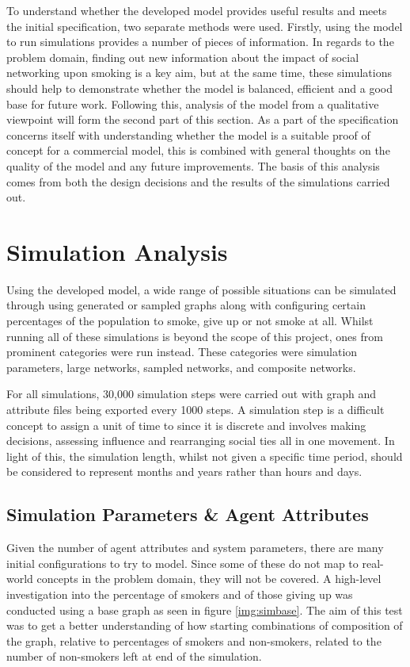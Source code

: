 \documentclass[]{report}
\begin{document}
To understand whether the developed model provides useful results and meets the initial specification, two separate methods were used. Firstly, using the model to run simulations provides a number of pieces of information. In regards to the problem domain, finding out new information about the impact of social networking upon smoking is a key aim, but at the same time, these simulations should help to demonstrate whether the model is balanced, efficient and a good base for future work. Following this, analysis of the model from a qualitative viewpoint will form the second part of this section. As a part of the specification concerns itself with understanding whether the model is a suitable proof of concept for a commercial model, this is combined with general thoughts on the quality of the model and any future improvements. The basis of this analysis comes from both the design decisions and the results of the simulations carried out.

\section{Simulation Analysis}
Using the developed model, a wide range of possible situations can be simulated through using generated or sampled graphs along with configuring certain percentages of the population to smoke, give up or not smoke at all. Whilst running all of these simulations is beyond the scope of this project, ones from prominent categories were run instead. These categories were simulation parameters, large networks, sampled networks, and composite networks.

For all simulations, 30,000 simulation steps were carried out with graph and attribute files being exported every 1000 steps. A simulation step is a difficult concept to assign a unit of time to since it is discrete and involves making decisions, assessing influence and rearranging social ties all in one movement. In light of this, the simulation length, whilst not given a specific time period, should be considered to represent months and years rather than hours and days.

\subsection{Simulation Parameters \& Agent Attributes}

Given the number of agent attributes and system parameters, there are many initial configurations to try to model. Since some of these do not map to real-world concepts in the problem domain, they will not be covered. A high-level investigation into the percentage of smokers and of those giving up was conducted using a base graph as seen in figure \ref{img:simbase}. The aim of this test was to get a better understanding of how starting combinations of composition of the graph, relative to percentages of smokers and non-smokers, related to the number of non-smokers left at end of the simulation. 
\end{document}
